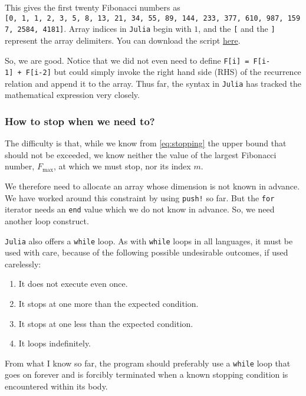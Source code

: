 \documentclass[
  a4paper,
]{article}
\providecommand{\tightlist}{%
  \setlength{\itemsep}{0pt}\setlength{\parskip}{0pt}}
\begin{document}
This gives the first twenty Fibonacci numbers as
\texttt{{[}0,\ 1,\ 1,\ 2,\ 3,\ 5,\ 8,\ 13,\ 21,\ 34,\ 55,\ 89,\ 144,\ 233,\ 377,\ 610,\ 987,\ 1597,\ 2584,\ 4181{]}}.
Array indices in \texttt{Julia} begin with \(1\), and the \texttt{{[}}
and the \texttt{{]}} represent the array delimiters. You can download
the script \href{auxiliary/first-twenty.jl}{here}.

So, we are good. Notice that we did not even need to define
\texttt{F{[}i{]}\ =\ F{[}i-1{]}\ +\ F{[}i-2{]}} but could simply invoke
the right hand side (RHS) of the recurrence relation and append it to
the array. Thus far, the syntax in \texttt{Julia} has tracked the
mathematical expression very closely.

\hypertarget{how-to-stop-when-we-need-to}{%
\subsubsection{How to stop when we need
to?}\label{how-to-stop-when-we-need-to}}

The difficulty is that, while we know from \cref{eq:stopping} the upper
bound that should not be exceeded, we know neither the value of the
largest Fibonacci number, \(F_{\max}\), at which we must stop, nor its
index \(m\).

We therefore need to allocate an array whose dimension is not known in
advance. We have worked around this constraint by using \texttt{push!}
so far. But the \texttt{for} iterator needs an \texttt{end} value which
we do not know in advance. So, we need another loop construct.

\texttt{Julia} also offers a \texttt{while} loop. As with \texttt{while}
loops in all languages, it must be used with care, because of the
following possible undesirable outcomes, if used carelessly:

\begin{enumerate}
\def\labelenumi{\alph{enumi}.}
\tightlist
\item
  It does not execute even once.
\item
  It stops at one more than the expected condition.
\item
  It stops at one less than the expected condition.
\item
  It loops indefinitely.
\end{enumerate}

From what I know so far, the program should preferably use a
\texttt{while} loop that goes on forever and is forcibly terminated when
a known stopping condition is encountered within its body.
\end{document}
